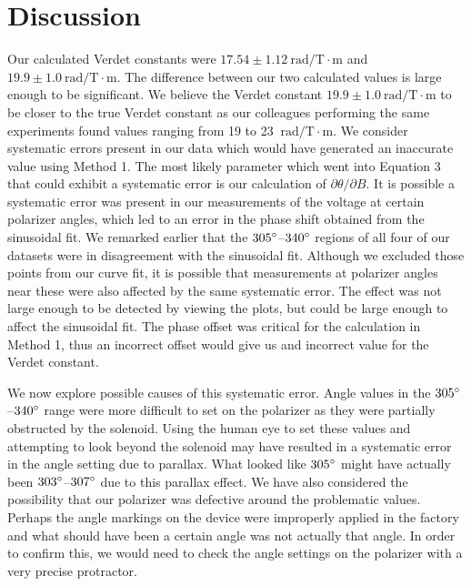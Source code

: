 \documentclass[prb,preprint]{revtex4-1}
\begin{document}
{\section{Discussion}
{Our calculated Verdet constants were $17.54 \pm 1.12 \mathrm{~rad/T} \cdot \textrm{m}$ and $19.9 \pm 1.0 \mathrm{~rad/T} \cdot \textrm{m}$.
The difference between our two calculated values is large enough to be significant. We believe the Verdet constant $19.9 \pm 1.0 \mathrm{~rad/T} \cdot \textrm{m}$ to be closer to the true Verdet constant as our colleagues performing the same experiments found values ranging from 19 to 23 $\mathrm{~rad/T} \cdot \textrm{m}$.
We consider systematic errors present in our data which would have generated an inaccurate value using Method 1.  The most likely parameter which went into Equation 3 that could exhibit a systematic error is our calculation of $\partial \theta/\partial B$. 
 It is possible a systematic error was present in our measurements of the voltage at certain polarizer angles, which led to an error in the phase shift obtained from the sinusoidal fit. We remarked earlier that the $305\degree$--$340\degree$ regions of all four of our datasets were in disagreement with the sinusoidal fit.  
Although we excluded those points from our curve fit, it is possible that measurements at polarizer angles near these were also affected by the same systematic error. The effect was not large enough to be detected by viewing the plots, but could be large enough to affect the sinusoidal fit.
The phase offset was critical for the calculation in Method 1, thus an incorrect offset would give us and incorrect value for the Verdet constant.

We now explore possible causes of this systematic error.  Angle values in the $305\degree$--$340\degree$ range were more difficult to set on the polarizer as they were partially obstructed by the solenoid.  
Using the human eye to set these values and attempting to look beyond the solenoid may have resulted in a systematic error in the angle setting due to parallax.  What looked like $305\degree$ might have actually been $303\degree$--$307\degree$ due to this parallax effect. 
We have also considered the possibility that our polarizer was defective around the problematic values.  
Perhaps the angle markings on the device were improperly applied in the factory and what should have been a certain angle was not actually that angle.  
In order to confirm this, we would need to check the angle settings on the polarizer with a very precise protractor.  


}}
\end{document}
